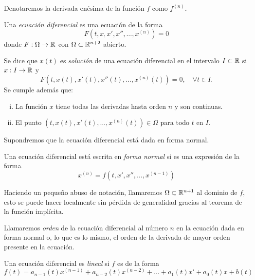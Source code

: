 \documentclass[../ecuaciones_diferenciales.tex]{subfiles}
\begin{document}
\begin{notation}
	Denotaremos la derivada enésima de la función \(f\) como \(f^{(n)}\).
\end{notation}

\begin{definition}
	Una \emph{ecuación diferencial} es una ecuación de la forma
	\[F(t, x, x', x'', \dots, x^{(n)}) = 0\]
	donde \(F : \Omega \to \mathbb{R}\) con \(\Omega \subset \mathbb{R}^{n + 2}\) abierto.
\end{definition}

\begin{definition}
    Se dice que \(x(t)\) es \emph{solución} de una ecuación diferencial en el
    intervalo
	\(I \subset \mathbb{R}\) si \(x : I \to \mathbb{R}\) y
	\[F(t, x(t), x'(t), x''(t), \dots, x^{(n)}(t)) = 0, \quad \forall t \in I.\]
	Se cumple además que:
	\begin{enumerate}[i)]
		\item La función \(x\) tiene todas las derivadas hasta orden \(n\) y son
		      continuas.
		\item El punto \((t, x(t), x'(t), \dots, x^{(n)}(t)) \in \Omega\) para
		      todo \(t\) en \(I\).
	\end{enumerate}
\end{definition}

Supondremos que la ecuación diferencial está dada en forma normal.

\begin{definition}
    Una ecuación diferencial está escrita en \emph{forma normal} si es una
    expresión de la forma
	\[x^{(n)} = f(t, x', x'', \dots, x^{(n - 1)})\]
\end{definition}

Haciendo un pequeño abuso de notación, llamaremos \(\Omega \subset \mathbb{R}^{n + 1}\)
al dominio de \(f\), esto se puede hacer localmente sin pérdida de generalidad
gracias al teorema de la función implícita.

\begin{definition}[Orden]
    Llamaremos \emph{orden} de la ecuación diferencial al número \(n\) en la
    ecuación dada en forma normal o, lo que es lo mismo,
    el orden de la derivada de mayor orden presente en la ecuación.
\end{definition}

\begin{definition}
	Una ecuación diferencial es \emph{lineal} si \(f\) es de la forma
	\[f(t) = a_{n - 1}(t)x^{(n - 1)} + a_{n - 2}(t)x^{(n - 2)} +
		\dots + a_1(t)x' + a_0(t)x + b(t)\]
\end{definition}
\end{document}
